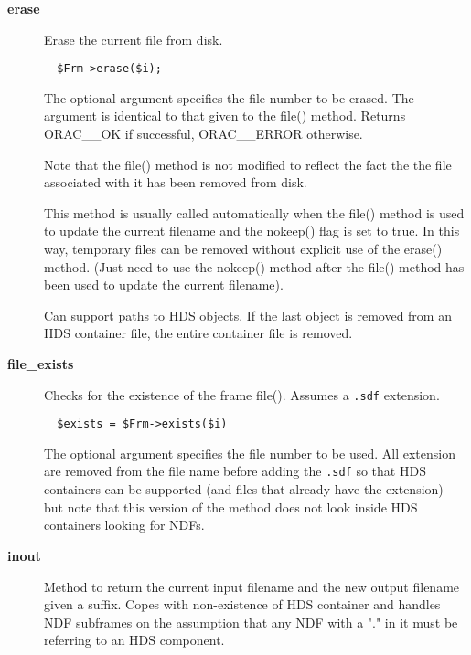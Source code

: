 \begin{description}
\begin{description}
\begin{description}
\item[{\textbf{erase}}] \mbox{}

Erase the current file from disk.

\begin{verbatim}
  $Frm->erase($i);
\end{verbatim}


The optional argument specifies the file number to be erased.
The argument is identical to that given to the file() method.
Returns ORAC\_\_OK if successful, ORAC\_\_ERROR otherwise.



Note that the file() method is not modified to reflect the
fact the the file associated with it has been removed from disk.



This method is usually called automatically when the file()
method is used to update the current filename and the nokeep()
flag is set to true. In this way, temporary files can be removed
without explicit use of the erase() method. (Just need to
use the nokeep() method after the file() method has been used
to update the current filename).



Can support paths to HDS objects. If the last object is removed from
an HDS container file, the entire container file is removed.


\item[{\textbf{file\_exists}}] \mbox{}

Checks for the existence of the frame file(). Assumes a \texttt{.sdf}
extension.

\begin{verbatim}
  $exists = $Frm->exists($i)
\end{verbatim}


The optional argument specifies the file number to be used.
All extension are removed from the file name before adding the
\texttt{.sdf} so that HDS containers can be supported (and files
that already have the extension)  -- but note that
this version of the method does not look inside HDS containers
looking for NDFs.


\item[{\textbf{inout}}] \mbox{}

Method to return the current input filename and the new output
filename given a suffix.  Copes with non-existence of HDS container
and handles NDF subframes on the assumption that any NDF with a
"." in it must be referring to an HDS component.




\end{description}
\end{description}
\end{description}
